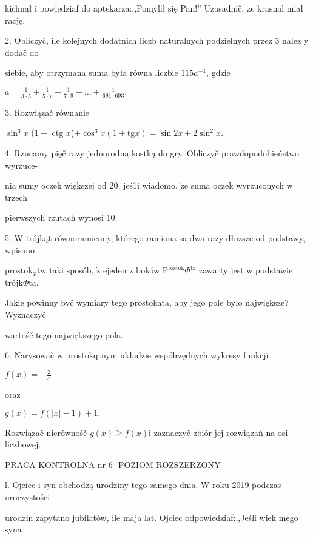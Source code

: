 \documentclass[a4paper,12pt]{article}
\begin{document}
kichnął $\mathrm{i}$ powiedziaf do aptekarza:,,Pomylił się Pan!'' Uzasadnič, $\dot{\mathrm{z}}\mathrm{e}$ krasnal miał rację.

2. Obliczyč, ile kolejnych dodatnich liczb naturalnych podzielnych przez 3 nalez $\mathrm{y}$ dodač do

siebie, aby otrzymana suma była równa liczbie $115a^{-1}$, gdzie

$a=\displaystyle \frac{1}{3\cdot 5}+\frac{1}{5\cdot 7}+\frac{1}{7\cdot 9}+\ldots+\frac{1}{691\cdot 693}.$

3. Rozwiązač równanie

$\sin^{3}x$ ($1+$ ctg $x$)$+\cos^{3}x(1+\mathrm{t}\mathrm{g}x)=\sin 2x+2\sin^{2}x.$

4. Rzucamy pięč razy jednorodną kostką do gry. Obliczyč prawdopodobieństwo wyrzuce-

nia sumy oczek większej od 20, jeś1i wiadomo, $\dot{\mathrm{z}}\mathrm{e}$ suma oczek wyrzuconych $\mathrm{w}$ trzech

pierwszych rzutach wynosi 10.

5. $\mathrm{W}$ trójkąt równoramienny, którego ramiona sa dwa razy dłuzsze od podstawy, wpisano

$\mathrm{p}\mathrm{r}\mathrm{o}\mathrm{s}\mathrm{t}\mathrm{o}\mathrm{k}_{\Phi}\mathrm{t}\mathrm{w}$ taki sposób, $\dot{\mathrm{z}}$ ejeden $\mathrm{z}$ boków $\mathrm{P}^{\mathrm{r}\mathrm{o}\mathrm{s}\mathrm{t}\mathrm{o}\mathrm{k}}\Phi^{\mathrm{t}\mathrm{a}}$ zawarty jest $\mathrm{w}$ podstawie trójk$\Phi$ta.

Jakie powinny byč wymiary tego prostokąta, aby jego pole było największe? Wyznaczyč

wartośč tego największego pola.

6. Narysowač $\mathrm{w}$ prostokqtnym układzie wspólrzędnych wykresy funkcji

$f(x)=-\displaystyle \frac{2}{x}$

oraz

$g(x)=f(|x|-1)+1.$

Rozwiązač nierównośč $g(x)\geq f(x)\mathrm{i}$ zaznaczyč zbiór jej rozwiązań na osi liczbowej.




PRACA KONTROLNA nr 6- POZIOM ROZSZERZONY

l. Ojciec $\mathrm{i}$ syn obchodzą urodziny tego samego dnia. $\mathrm{W}$ roku 2019 podczas uroczystości

urodzin zapytano jubilatów, ile maja lat. Ojciec odpowiedziaf:,,Jeśli wiek mego syna
\end{document}
